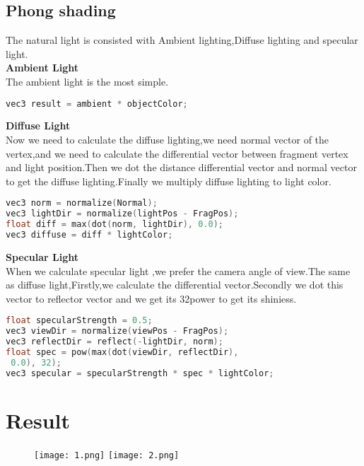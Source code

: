 \documentclass[acmtog]{acmart}
\begin{document}
\subsection{Phong shading}
The natural light is consisted with Ambient lighting,Diffuse lighting and specular light.\\
\textbf{Ambient Light}\\
The ambient light is the most simple.\\
\begin{lstlisting}[language=C]
vec3 result = ambient * objectColor;
\end{lstlisting} 
\textbf{Diffuse Light}\\
Now we need to calculate the diffuse lighting,we need normal vector of the vertex,and we need to calculate the differential vector between fragment vertex and light position.Then we dot the distance differential vector and normal vector to get the diffuse lighting.Finally we multiply diffuse lighting to light color.\\
\begin{lstlisting}[language=C]
vec3 norm = normalize(Normal);
vec3 lightDir = normalize(lightPos - FragPos);
float diff = max(dot(norm, lightDir), 0.0);
vec3 diffuse = diff * lightColor;
\end{lstlisting} 
\textbf{Specular Light}\\
When we calculate specular light ,we prefer the camera angle of view.The same as diffuse light,Firstly,we calculate the differential vector.Secondly we dot this vector to reflector vector and we get its 32power to get its shiniess.
\begin{lstlisting}[language=C]
float specularStrength = 0.5;
vec3 viewDir = normalize(viewPos - FragPos);
vec3 reflectDir = reflect(-lightDir, norm);  
float spec = pow(max(dot(viewDir, reflectDir),
 0.0), 32);
vec3 specular = specularStrength * spec * lightColor;  
\end{lstlisting} 
\section{Result}
\begin{figure}[h]
    \centering
    \texttt{[image: 1.png]}
    \texttt{[image: 2.png]}
    \label{fig:result1}
\end{figure}
\end{document}
